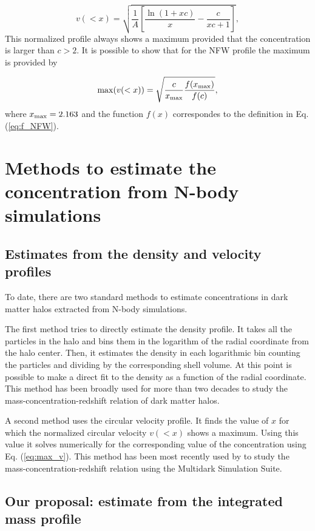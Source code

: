 \documentclass[a4,useAMS,usenatbib,usegraphicx]{mn2e}
\begin{document}
\begin{equation}
v(<x)=\sqrt{\frac{1}{A}\left[\frac{\ln\left(1+xc\right)}{x}-\frac{c}{xc+1}\right]},
\end{equation}
%
This normalized profile always shows a maximum provided that the
concentration is larger than $c>2$.
It is possible to show that for the NFW profile the maximum is
provided by

\begin{equation}
\mathrm{max}(v(<x)) = \sqrt{\frac{c}{x_{\rm max}}\frac{f(x_{\rm
      max})}{f(c)}},
\label{eq:max_v}
\end{equation}
where $x_{\rm max}=2.163$ \citep{Klypin2014} and the function $f(x)$
correspondes to the definition in Eq. (\ref{eq:f_NFW}).

\section{Methods to estimate the concentration from N-body simulations}
\label{sec:method}

\subsection{Estimates from the density and velocity profiles}

To date, there are two standard methods to estimate concentrations in
dark matter halos extracted from N-body simulations. 

The first method tries to directly estimate the density profile.  
It takes all the particles in the halo and bins them in the logarithm of
the radial coordinate from the halo center.  
Then, it estimates the density in each logarithmic bin counting the
particles and dividing by the corresponding shell volume.  
At this point is possible to make a direct fit to the density as a
function of the radial coordinate. 
This method has been broadly used for more than two decades to study
the mass-concentration-redshift relation of dark matter halos.
 
A second method uses the circular velocity profile.  
It finds the value of $x$ for which the normalized circular velocity
$v(<x)$ shows a maximum.  
Using this value it solves numerically for the corresponding value of
the concentration using Eq. (\ref{eq:max_v}). 
This method has been most recently used by \cite{Klypin2014} to study
the mass-concentration-redshift relation using the Multidark
Simulation Suite. 


\subsection{Our proposal: estimate from the integrated mass profile}
\end{document}
